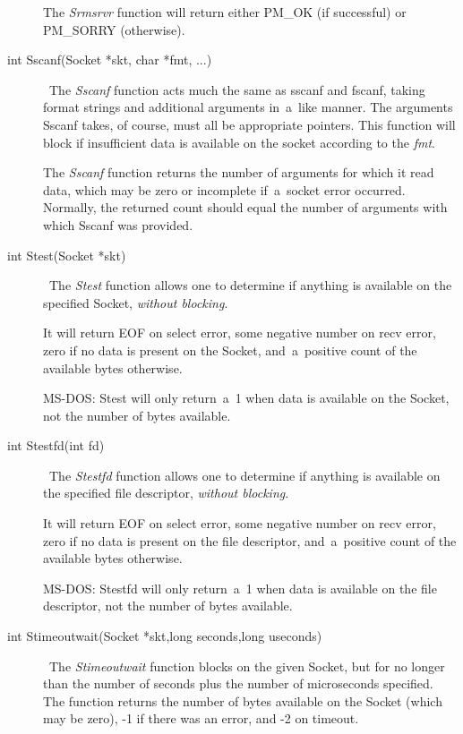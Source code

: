 \documentclass[12pt]{article}
\begin{document}
\begin{description}
    The {\em Srmsrvr} function will return either {\small PM\_OK} (if
    successful) or {\small PM\_SORRY} (otherwise).

\item[int Sscanf(Socket *skt, char *fmt, ...)] \     The {\em Sscanf} function acts much the same as sscanf and fscanf, taking
    format strings and additional arguments in~a~like manner.  The arguments
    Sscanf takes, of course, must all be appropriate pointers.  This function
    will block if insufficient data is available on the socket according to the
    {\em fmt}.

    The {\em Sscanf} function returns the number of arguments for which it read
    data, which may be zero or incomplete if~a~socket error occurred.
    Normally, the returned count should equal the number of arguments with
    which Sscanf was provided.

\item[int Stest(Socket *skt)] \     The {\em Stest} function allows one to determine if anything is available
    on the specified Socket, {\em without blocking}.

    It will return EOF on select error, some negative number on recv error,
    zero if no data is present on the Socket, and~a~positive count of the
    available bytes otherwise.

    {\small MS-DOS}: Stest will only return~a~1 when data is available
    on the Socket, not the number of bytes available.

\item[int Stestfd(int fd)] \     The {\em Stestfd} function allows one to determine if anything is available
    on the specified file descriptor, {\em without blocking}.

    It will return EOF on select error, some negative number on recv error,
    zero if no data is present on the file descriptor, and~a~positive count of the
    available bytes otherwise.

    {\small MS-DOS}: Stestfd will only return~a~1 when data is available
    on the file descriptor, not the number of bytes available.

\item[int Stimeoutwait(Socket *skt,long seconds,long useconds)] \     The {\em Stimeoutwait} function blocks on the given Socket, but for no
    longer than the number of seconds plus the number of microseconds specified.
    The function returns the number of bytes available on the Socket (which may be
    zero), -1 if there was an error, and -2 on timeout.


\end{description}
\end{document}
